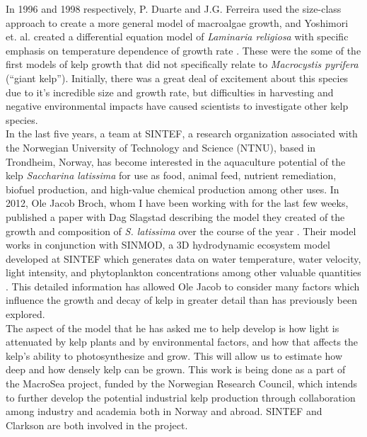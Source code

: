 In 1996 and 1998 respectively, P. Duarte and J.G. Ferreira used the size-class approach to create a more general model of macroalgae growth, and Yoshimori et. al. created a differential equation model of \textit{Laminaria religiosa} with specific emphasis on temperature dependence of growth rate \cite{duarte_model_1997,yoshimori_mathematical_1998}.
These were the some of the first models of kelp growth that did not specifically relate to \textit{Macrocystis pyrifera} (``giant kelp''). 
Initially, there was a great deal of excitement about this species due to it's incredible size and growth rate, but difficulties in harvesting and negative environmental impacts have caused scientists to investigate other kelp species. \\[-0.75em]

In the last five years, a team at SINTEF, a research organization associated with the Norwegian University of Technology and Science (NTNU), based in Trondheim, Norway, has become interested in the aquaculture potential of the kelp \textit{Saccharina latissima} for use as food, animal feed, nutrient remediation, biofuel production, and high-value chemical production among other uses. 
In 2012, Ole Jacob Broch, whom I have been working with for the last few weeks, published a paper with Dag Slagstad describing the model they created of the growth and composition of \textit{S. latissima} over the course of the year \cite{broch_modelling_2012}.
Their model works in conjunction with SINMOD, a 3D hydrodynamic ecosystem model developed at SINTEF which generates data on water temperature, water velocity, light intensity, and phytoplankton concentrations among other valuable quantities \cite{wassmann_modelling_2006}.
This detailed information has allowed Ole Jacob to consider many factors which influence the growth and decay of kelp in greater detail than has previously been explored. \\[-0.75em]

The aspect of the model that he has asked me to help develop is how light is attenuated by kelp plants and by environmental factors, and how that affects the kelp's ability to photosynthesize and grow. 
This will allow us to estimate how deep and how densely kelp can be grown. This work is being done as a part of the MacroSea project, funded by the Norwegian Research Council, which intends to further develop the potential industrial kelp production through collaboration among industry and academia both in Norway and abroad. SINTEF and Clarkson are both involved in the project. \\[-0.75em]

